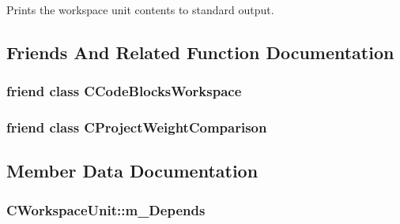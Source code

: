 Prints the workspace unit contents to standard output. 



\subsection{Friends And Related Function Documentation}
\hypertarget{classCWorkspaceUnit_a202ad87f231d244c3c0c3537e01a269b}{
\subsubsection[{C\-Code\-Blocks\-Workspace}]{\setlength{\rightskip}{0pt plus 5cm}friend class {\bf C\-Code\-Blocks\-Workspace}\hspace{0.3cm}{\ttfamily [friend]}}}\label{classCWorkspaceUnit_a202ad87f231d244c3c0c3537e01a269b}
\hypertarget{classCWorkspaceUnit_a67d24e5943ac4af577992f63a808c689}{
\subsubsection[{C\-Project\-Weight\-Comparison}]{\setlength{\rightskip}{0pt plus 5cm}friend class {\bf C\-Project\-Weight\-Comparison}\hspace{0.3cm}{\ttfamily [friend]}}}\label{classCWorkspaceUnit_a67d24e5943ac4af577992f63a808c689}


\subsection{Member Data Documentation}
\hypertarget{classCWorkspaceUnit_a6984ed5bc47822d9d8cbc1bf82f19beb}{
\subsubsection[{m\-\_\-\-Depends}]{\setlength{\rightskip}{0pt plus 5cm}C\-Workspace\-Unit\-::m\-\_\-\-Depends\hspace{0.3cm}{\ttfamily [private]}}}\label{classCWorkspaceUnit_a6984ed5bc47822d9d8cbc1bf82f19beb}


